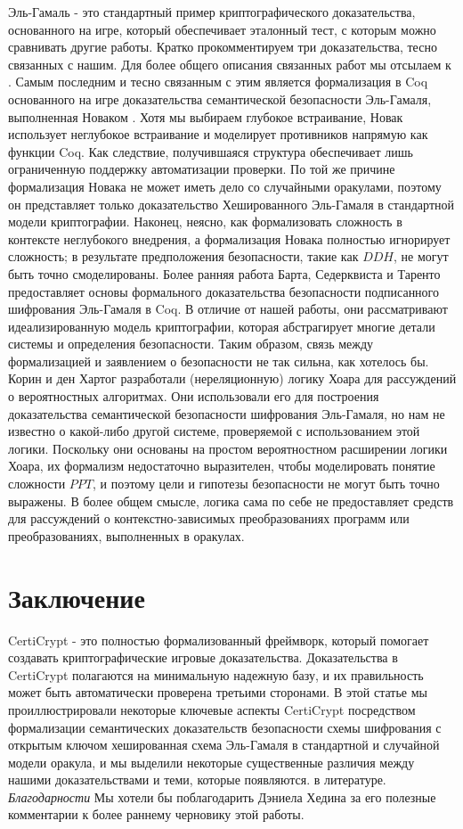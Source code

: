 \documentclass[a4paper,12pt]{report}
\begin{document}
Эль-Гамаль - это стандартный пример криптографического доказательства, основанного на игре, который обеспечивает эталонный тест, с которым можно сравнивать другие работы. Кратко прокомментируем три доказательства, тесно связанных с нашим. Для более общего описания связанных работ мы отсылаем к \cite{1}. 
Самым последним и тесно связанным с этим является формализация в Coq основанного на игре доказательства семантической безопасности Эль-Гамаля, выполненная Новаком \cite{12}. Хотя мы выбираем глубокое встраивание, Новак использует неглубокое встраивание и моделирует противников напрямую как функции Coq. Как следствие, получившаяся структура обеспечивает лишь ограниченную поддержку автоматизации проверки. По той же причине формализация Новака не может иметь дело со случайными оракулами, поэтому он представляет только доказательство Хешированного Эль-Гамаля в стандартной модели криптографии. Наконец, неясно, как формализовать сложность в контексте неглубокого внедрения, а формализация Новака полностью игнорирует сложность; в результате предположения безопасности, такие как $DDH$, не могут быть точно смоделированы. 
Более ранняя работа Барта, Седерквиста и Таренто \cite{13} предоставляет основы формального доказательства безопасности подписанного шифрования Эль-Гамаля в Coq. В отличие от нашей работы, они рассматривают идеализированную модель криптографии, которая абстрагирует многие детали системы и определения безопасности. Таким образом, связь между формализацией и заявлением о безопасности не так сильна, как хотелось бы. 
Корин и ден Хартог \cite{14} разработали (нереляционную) логику Хоара для рассуждений о вероятностных алгоритмах. Они использовали его для построения доказательства семантической безопасности шифрования Эль-Гамаля, но нам не известно о какой-либо другой системе, проверяемой с использованием этой логики. Поскольку они основаны на простом вероятностном расширении логики Хоара, их формализм недостаточно выразителен, чтобы моделировать понятие сложности $PPT$, и поэтому цели и гипотезы безопасности не могут быть точно выражены. В более общем смысле, логика сама по себе не предоставляет средств для рассуждений о контекстно-зависимых преобразованиях программ или преобразованиях, выполненных в оракулах.

\section{Заключение}

CertiCrypt - это полностью формализованный фреймворк, который помогает создавать криптографические игровые доказательства. Доказательства в CertiCrypt полагаются на минимальную надежную базу, и их правильность может быть автоматически проверена третьими сторонами. В этой статье мы проиллюстрировали некоторые ключевые аспекты CertiCrypt посредством формализации семантических доказательств безопасности схемы шифрования с открытым ключом хешированная схема Эль-Гамаля в стандартной и случайной модели оракула, и мы выделили некоторые существенные различия между нашими доказательствами и теми, которые появляются. в литературе. 
\textit{Благодарности} Мы хотели бы поблагодарить Дэниела Хедина за его полезные комментарии к более раннему черновику этой работы.
\end{document}
